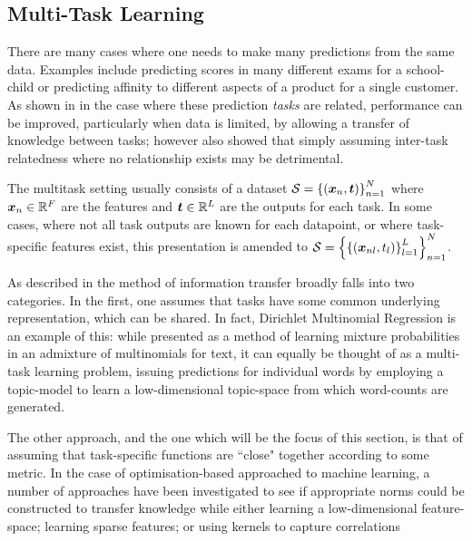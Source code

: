 

\subsection{Multi-Task Learning}

There are many cases where one needs to make many predictions from the same data. Examples include predicting scores in many different exams for a school-child\cite{Bonilla2008}\cite{Evgeniou2005} or predicting affinity to different aspects of a product for a single customer\cite{Allenby1999}. As shown in \cite{Caruana1997} in the case where these prediction \emph{tasks} are related, performance can be improved, particularly when data is limited, by allowing a transfer of knowledge between tasks; however \cite{Caruana1997} also showed that simply assuming inter-task relatedness where no relationship exists may be detrimental.

The multitask setting usually consists of a dataset $\mathcal{S} = \left\{\left(\bm x_n, \bm t\right)\right\}_{n=1}^N$ where $\bm x_n \in { \mathbb{R}^{F} }$ are the features and $\bm t \in { \mathbb{R}^{L} }$ are the outputs for each task. In some cases, where not all task outputs are known for each datapoint, or where task-specific features exist, this presentation is amended to $\mathcal{S} = \left\{\left\{\left(\bm x_{nl}, t_l\right)\right\}_{l=1}^L\right\}_{n=1}^N$. 

As described in\cite{Argyriou2005} the method of information transfer broadly falls into two categories. In the first, one assumes that tasks have some common underlying representation, which can be shared\cite{Caruana1997}. In fact, Dirichlet Multinomial Regression\cite{Mimno2008} is an example of this: while presented as a method of learning mixture probabilities in an admixture of multinomials for text, it can equally be thought of as a multi-task learning problem, issuing predictions for individual words by employing a topic-model to learn a low-dimensional topic-space from which word-counts are generated. 

The other approach, and the one which will be the focus of this section, is that of assuming that task-specific functions are ``close" together according to some metric. In the case of optimisation-based approached to machine learning, a number of approaches have been investigated to see if appropriate norms could be constructed to transfer knowledge while either learning a low-dimensional feature-space\cite{argyriou2007spectral}; learning sparse features\cite{Argyriou2005}; or using kernels to capture correlations\cite{Evgeniou2005}

